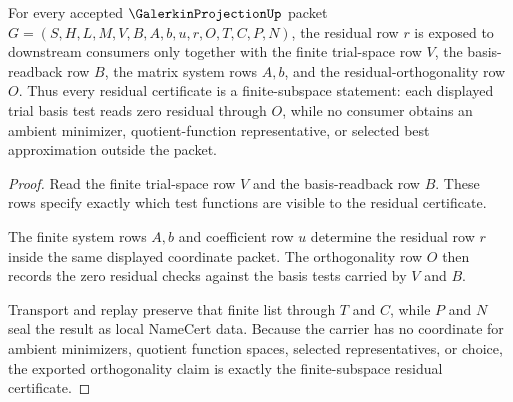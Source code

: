 \begin{theorem}
\label{thm:galerkin-projection-finite-subspace-residual-orthogonality}
For every accepted $\GalerkinProjectionUp$ packet $G=(S,H,L,M,V,B,A,b,u,r,O,T,C,P,N)$, the residual row $r$ is exposed to downstream consumers only together with the finite trial-space row $V$, the basis-readback row $B$, the matrix system rows $A,b$, and the residual-orthogonality row $O$. Thus every residual certificate is a finite-subspace statement: each displayed trial basis test reads zero residual through $O$, while no consumer obtains an ambient minimizer, quotient-function representative, or selected best approximation outside the packet.
\end{theorem}
\begin{proof}
Read the finite trial-space row $V$ and the basis-readback row $B$. These rows specify exactly which test functions are visible to the residual certificate.

The finite system rows $A,b$ and coefficient row $u$ determine the residual row $r$ inside the same displayed coordinate packet. The orthogonality row $O$ then records the zero residual checks against the basis tests carried by $V$ and $B$.

Transport and replay preserve that finite list through $T$ and $C$, while $P$ and $N$ seal the result as local NameCert data. Because the carrier has no coordinate for ambient minimizers, quotient function spaces, selected representatives, or choice, the exported orthogonality claim is exactly the finite-subspace residual certificate.
\end{proof}




